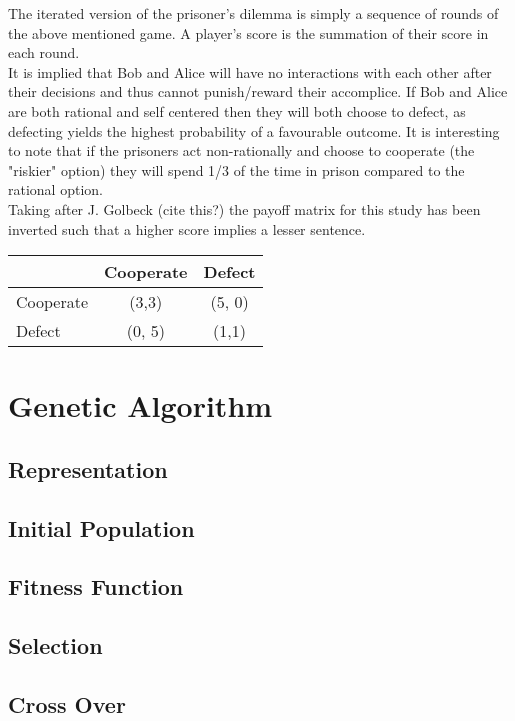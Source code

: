 \documentclass[12pt]{article}
\begin{document}
The iterated version of the prisoner's dilemma is simply a sequence of rounds of
the above mentioned game.  A player's score is the summation of their score in
each round. \\

It is implied that Bob and Alice will have no interactions with each other after
their decisions and thus cannot punish/reward their accomplice. If Bob and Alice are
both rational and self centered then they will both choose to defect, as defecting
yields the highest probability of a favourable outcome.  It is interesting to note
that if the prisoners act non-rationally and choose to cooperate
(the "riskier" option) they will spend 1/3 of the time in prison compared
to the rational option. \\

Taking after J. Golbeck (cite this?) the payoff matrix for this study has been
inverted such that a higher score implies a lesser sentence. \\

\begin{center}
\begin{tabular}{l | c | c}
     & Cooperate & Defect \\
    \hline
    Cooperate & (3,3) & (5, 0)\\ 
    \hline
    Defect & (0, 5) & (1,1) \\
\end{tabular}
\end{center}

\pagebreak

\section{Genetic Algorithm}

\subsection{Representation}
\subsection{Initial Population}
\subsection{Fitness Function}
\subsection{Selection}
\subsection{Cross Over}
\end{document}
